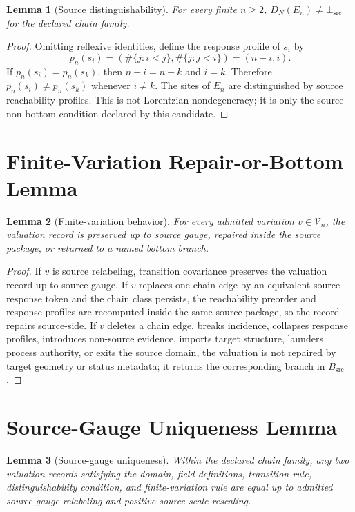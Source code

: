 \documentclass[11pt]{article}
\newcommand{\BottomSrc}{\bot_{\mathrm{src}}}
\newcommand{\En}{E_n}
\newtheorem{lemma}{Lemma}
\begin{document}
\begin{lemma}[Source distinguishability]
For every finite \(n\ge 2\), \(D_N(\En)\neq\BottomSrc\) for the declared
chain family.
\end{lemma}

\begin{proof}
Omitting reflexive identities, define the response profile of \(s_i\) by
\[
  p_n(s_i)=
  \left(\#\{j:i<j\},\#\{j:j<i\}\right)=(n-i,i).
\]
If \(p_n(s_i)=p_n(s_k)\), then \(n-i=n-k\) and \(i=k\). Therefore
\(p_n(s_i)\ne p_n(s_k)\) whenever \(i\ne k\). The sites of \(\En\) are
distinguished by source reachability profiles. This is not Lorentzian
nondegeneracy; it is only the source non-bottom condition declared by this
candidate.
\end{proof}

\section{Finite-Variation Repair-or-Bottom Lemma}

\begin{lemma}[Finite-variation behavior]
For every admitted variation \(v\in\mathcal{V}_n\), the valuation record is
preserved up to source gauge, repaired inside the source package, or returned
to a named bottom branch.
\end{lemma}

\begin{proof}
If \(v\) is source relabeling, transition covariance preserves the valuation
record up to source gauge. If \(v\) replaces one chain edge by an equivalent
source response token and the chain class persists, the reachability preorder
and response profiles are recomputed inside the same source package, so the
record repairs source-side. If \(v\) deletes a chain edge, breaks incidence,
collapses response profiles, introduces non-source evidence, imports target
structure, launders process authority, or exits the source domain, the
valuation is not repaired by target geometry or status metadata; it returns
the corresponding branch in \(B_{\mathrm{src}}\).
\end{proof}

\section{Source-Gauge Uniqueness Lemma}

\begin{lemma}[Source-gauge uniqueness]
Within the declared chain family, any two valuation records satisfying the
domain, field definitions, transition rule, distinguishability condition, and
finite-variation rule are equal up to admitted source-gauge relabeling and
positive source-scale rescaling.
\end{lemma}
\end{document}
